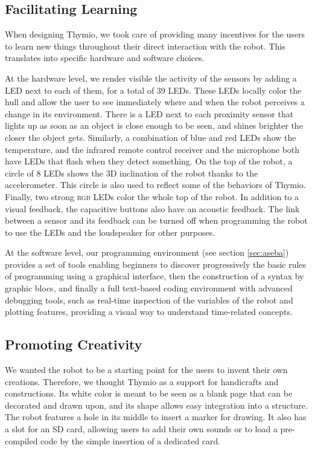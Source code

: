 \documentclass[letterpaper, 10 pt, conference]{ieeeconf}  %
\begin{document}
\subsection{Facilitating Learning}

When designing Thymio, we took care of providing many incentives for the users to learn new things throughout their direct interaction with the robot.
This translates into specific hardware and software choices.

At the hardware level, we render visible the activity of the sensors by adding a LED next to each of them, for a total of 39 LEDs.
These LEDs locally color the hull and allow the user to see immediately where and when the robot perceives a change in its environment.
There is a LED next to each proximity sensor that lights up as soon as an object is close enough to be seen, and shines brighter the closer the object gets.
Similarly, a combination of blue and red LEDs show the temperature, and the infrared remote control receiver and the microphone both have LEDs that flash when they detect something.
On the top of the robot, a circle of 8 LEDs shows the 3D inclination of the robot thanks to the accelerometer. 
This circle is also used to reflect some of the behaviors of Thymio.
Finally, two strong \textsc{rgb} LEDs color the whole top of the robot.
In addition to a visual feedback, the capacitive buttons also have an acoustic feedback.
The link between a sensor and its feedback can be turned off when programming the robot to use the LEDs and the loudspeaker for other purposes.

At the software level, our programming environment (see section \ref{sec:aseba}) provides a set of tools enabling beginners to discover progressively the basic rules of programming using a graphical interface, then the construction of a syntax by graphic blocs, and finally a full text-based coding environment with advanced debugging tools, such as real-time inspection of the variables of the robot and plotting features, providing a visual way to understand time-related concepts.

\subsection{Promoting Creativity}
\label{sec:crea}

We wanted the robot to be a starting point for the users to invent their own creations.
Therefore, we thought Thymio as a support for handicrafts and constructions.
Its white color is meant to be seen as a blank page that can be decorated and drawn upon, and its shape allows easy integration into a structure.
The robot features a hole in its middle to insert a marker for drawing.
It also has a slot for an SD card, allowing users to add their own sounds or to load a pre-compiled code by the simple insertion of a dedicated card.
\end{document}
